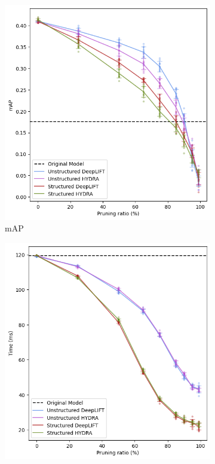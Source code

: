 \documentclass[journal,onecolumn,12pt]{IEEEtran}
\begin{document}
\begin{figure}
    \centering
    \captionsetup{justification=centering,margin=1cm}
    \begin{subfigure}[b]{.5\textwidth}
      \centering
      \includegraphics[width=1\linewidth]{figures/mAP1.PNG}
      \caption{mAP}
      \label{fig:mAP1}
    \end{subfigure}%
    \begin{subfigure}[b]{.5\textwidth}
      \centering
      \includegraphics[width=1\linewidth]{figures/time1.PNG}

\end{subfigure}
\end{figure}
\end{document}
